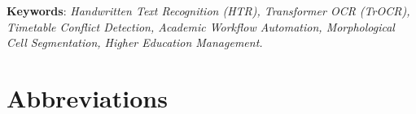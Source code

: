 \documentclass[12pt,letterpaper]{report}
\begin{document}
\vspace{0.8cm}
\noindent \textbf{Keywords}: \textit{Handwritten Text Recognition (HTR), Transformer OCR (TrOCR), Timetable Conflict Detection, Academic Workflow Automation, Morphological Cell Segmentation, Higher Education Management.}

\newpage
\tableofcontents

\newpage
\listoftables

\newpage
\listoffigures

\newpage
\chapter*{Abbreviations}
\end{document}
